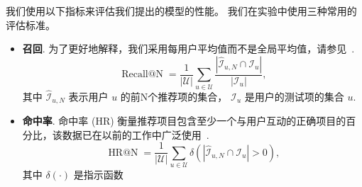 
我们使用以下指标来评估我们提出的模型的性能。 我们在实验中使用三种常用的评估标准。
\begin{itemize}
    \item \textbf{召回}. 为了更好地解释，我们采用每用户平均值而不是全局平均值，请参见~\cite{karypis2001evaluation,chen2018sequential}.
        \begin{equation}
            \operatorname{Recall@N} = \frac{1}{|\mathcal{U}|}\sum_{u\in \mathcal{U}} \frac{|\mathcal{\hat{I}}_{u,N} \cap \mathcal{I}_{u}|}{|\mathcal{I}_u|},
        \end{equation}
        其中 $\mathcal{\hat{I}}_{u,N}$ 表示用户 $u$ 的前N个推荐项的集合， $\mathcal{I}_u$ 是用户的测试项的集合 $u$.
    
    \item \textbf{命中率}. 命中率 (HR) 衡量推荐项目包含至少一个与用户互动的正确项目的百分比，该数据已在以前的工作中广泛使用~\cite{karypis2001evaluation,chen2018sequential}.
        \begin{equation}
            \operatorname{HR@N} = \frac{1}{|\mathcal{U}|}\sum_{u\in \mathcal{U}} \delta(|\mathcal{\hat{I}}_{u,N} \cap \mathcal{I}_{u}|>0),
        \end{equation}
        其中 $\delta(\cdot)$ 是指示函数





\end{itemize}
